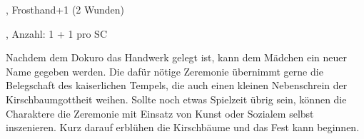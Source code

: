 {			, Frosthand+1 (2 Wunden)

			, Anzahl: 1 + 1 pro SC


		\noindent
		Nachdem dem Dokuro das Handwerk gelegt ist, kann dem Mädchen ein neuer Name gegeben werden. Die dafür nötige Zeremonie übernimmt gerne die Belegschaft des kaiserlichen Tempels, die auch einen kleinen Nebenschrein der Kirschbaumgottheit weihen. Sollte noch etwas Spielzeit übrig sein, können die Charaktere die Zeremonie mit Einsatz von Kunst oder Sozialem selbst inszenieren. Kurz darauf erblühen die Kirschbäume und das Fest kann beginnen.
}
